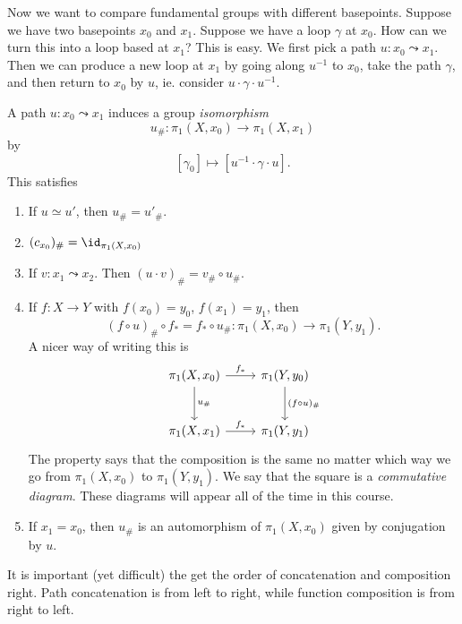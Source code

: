 \documentclass[a4paper]{article}
\begin{document}
Now we want to compare fundamental groups with different basepoints. Suppose we have two basepoints $x_0$ and $x_1$. Suppose we have a loop $\gamma$ at $x_0$. How can we turn this into a loop based at $x_1$? This is easy. We first pick a path $u: x_0 \leadsto x_1$. Then we can produce a new loop at $x_1$ by going along $u^{-1}$ to $x_0$, take the path $\gamma$, and then return to $x_0$ by $u$, ie. consider $u\cdot \gamma\cdot u^{-1}$.
\begin{center}
\end{center}

\begin{prop}
  A path $u: x_0 \leadsto x_1$ induces a group \emph{isomorphism}
  \[
    u_\#: \pi_1(X, x_0) \to \pi_1(X, x_1)
  \]
  by
  \[
    [\gamma_0] \mapsto [u^{-1}\cdot \gamma \cdot u].
  \]
  This satisfies
  \begin{enumerate}
    \item If $u\simeq u'$, then $u_\# = u'_\#$.
    \item $(c_{x_0})_\# = \id_{\pi_1(X, x_0)}$
    \item If $v: x_1 \leadsto x_2$. Then $(u\cdot v)_\# = v_\# \circ u_\#$.
    \item If $f: X\to Y$ with $f(x_0) = y_0$, $f(x_1) = y_1$, then
      \[
        (f\circ u)_\# \circ f_* = f_* \circ u_\#: \pi_1(X, x_0) \to \pi_1(Y, y_1).
      \]
      A nicer way of writing this is
      \[
        \begin{tikzcd}[row sep=large]
          \pi_1(X, x_0) \ar[r, "f_*"] \ar[d, "u_\#"] & \pi_1(Y, y_0)\ar [d, "(f\circ u)_\#"]\\
          \pi_1(X, x_1) \ar[r, "f_*"] & \pi_1(Y, y_1)
        \end{tikzcd}
      \]
      The property says that the composition is the same no matter which way we go from $\pi_1(X, x_0)$ to $\pi_1(Y, y_1)$. We say that the square is a \emph{commutative diagram}. These diagrams will appear all of the time in this course.
    \item If $x_1 = x_0$, then $u_\#$ is an automorphism of $\pi_1(X, x_0)$ given by conjugation by $u$.
  \end{enumerate}
\end{prop}
It is important (yet difficult) the get the order of concatenation and composition right. Path concatenation is from left to right, while function composition is from right to left.
\end{document}

